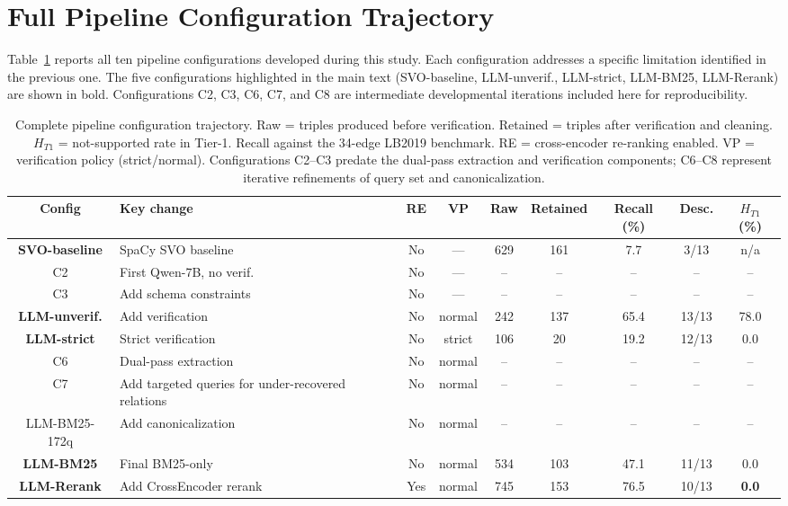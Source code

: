 \documentclass[10pt]{article}
\begin{document}
\section{Full Pipeline Configuration Trajectory}
\label{app:full-trajectory}

Table~\ref{tab:full-trajectory} reports all ten
pipeline configurations developed during this study.
Each configuration addresses a specific limitation
identified in the previous one.
The five configurations highlighted in the main text
(SVO-baseline, LLM-unverif., LLM-strict, LLM-BM25, LLM-Rerank) are shown in bold.
Configurations C2, C3, C6, C7, and C8 are
intermediate developmental iterations included here
for reproducibility.

\begin{table}[htb]
\centering
\caption{Complete pipeline configuration trajectory.
  Raw = triples produced before verification.
  Retained = triples after verification and cleaning.
  $H_{T1}$ = not-supported rate in Tier-1.
  Recall against the 34-edge LB2019 benchmark.
  RE = cross-encoder re-ranking enabled.
  VP = verification policy (strict/normal).
  Configurations C2--C3 predate the dual-pass
  extraction and verification components;
  C6--C8 represent iterative refinements of
  query set and canonicalization.}
\label{tab:full-trajectory}
\small
\setlength{\tabcolsep}{4pt}
\begin{tabular}{clccccccc}
\toprule
\textbf{Config} &
\textbf{Key change} &
\textbf{RE} &
\textbf{VP} &
\textbf{Raw} &
\textbf{Retained} &
\textbf{Recall (\%)} &
\textbf{Desc.} &
$H_{T1}$ (\%) \\
\midrule
\textbf{SVO-baseline}
  & SpaCy SVO baseline
  & No & --- & 629 & 161 & 7.7 & 3/13 & n/a \\
C2
  & First Qwen-7B, no verif.
  & No & --- & -- & -- & -- & -- & -- \\
C3
  & Add schema constraints
  & No & --- & -- & -- & -- & -- & -- \\
\textbf{LLM-unverif.}
  & Add verification
  & No & normal & 242 & 137 & 65.4 & 13/13 & 78.0 \\
\textbf{LLM-strict}
  & Strict verification
  & No & strict & 106 & 20 & 19.2 & 12/13 & 0.0 \\
C6
  & Dual-pass extraction
  & No & normal & -- & -- & -- & -- & -- \\
C7
  & Add targeted queries for under-recovered relations
  & No & normal & -- & -- & -- & -- & -- \\
LLM-BM25-172q
  & Add canonicalization
  & No & normal & -- & -- & -- & -- & -- \\
\textbf{LLM-BM25}
  & Final BM25-only
  & No & normal & 534 & 103 & 47.1 & 11/13 & 0.0 \\
\textbf{LLM-Rerank}
  & Add CrossEncoder rerank
  & Yes & normal & 745 & 153 & 76.5 & 10/13 & \textbf{0.0} \\
\bottomrule
\end{tabular}
\end{table}
\end{document}
